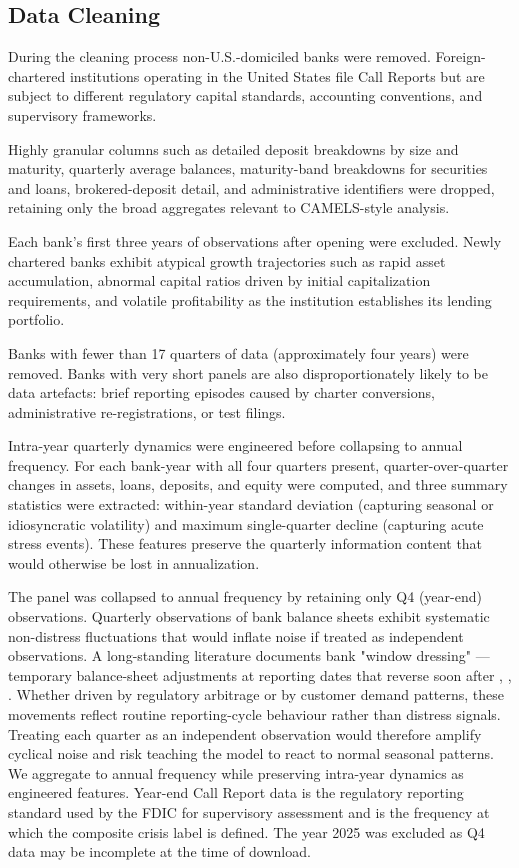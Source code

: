 \documentclass[conference]{IEEEtran}
\begin{document}
\subsection{Data Cleaning}
During the cleaning process non-U.S.-domiciled banks were removed. Foreign-chartered institutions operating in the United States file Call Reports but are subject to different regulatory capital standards, accounting conventions, and supervisory frameworks. 

Highly granular columns such as detailed deposit breakdowns by size and maturity, quarterly average balances, maturity-band breakdowns for securities and loans, brokered-deposit detail, and administrative identifiers were dropped, retaining only the broad aggregates relevant to CAMELS-style analysis.

Each bank's first three years of observations after opening were excluded. Newly chartered banks exhibit atypical growth trajectories such as rapid asset accumulation, abnormal capital ratios driven by initial capitalization requirements, and volatile profitability as the institution establishes its lending portfolio. 

Banks with fewer than 17 quarters of data (approximately four years) were removed. Banks with very short panels are also disproportionately likely to be data artefacts: brief reporting episodes caused by charter conversions, administrative re-registrations, or test filings.

Intra-year quarterly dynamics were engineered before collapsing to annual frequency. For each bank-year with all four quarters present, quarter-over-quarter changes in assets, loans, deposits, and equity were computed, and three summary statistics were extracted: within-year standard deviation (capturing seasonal or idiosyncratic volatility) and maximum single-quarter decline (capturing acute stress events). These features preserve the quarterly information content that would otherwise be lost in annualization.

The panel was collapsed to annual frequency by retaining only Q4 (year-end) observations. Quarterly observations of bank balance sheets exhibit systematic non-distress fluctuations that would inflate noise if treated as independent observations. A long-standing literature documents bank "window dressing" — temporary balance-sheet adjustments at reporting dates that reverse soon after \cite{b15}, \cite{b16}, \cite{b17}. Whether driven by regulatory arbitrage or by customer demand patterns, these movements reflect routine reporting-cycle behaviour rather than distress signals. Treating each quarter as an independent observation would therefore amplify cyclical noise and risk teaching the model to react to normal seasonal patterns. We aggregate to annual frequency while preserving intra-year dynamics as engineered features. Year-end Call Report data is the regulatory reporting standard used by the FDIC for supervisory assessment and is the frequency at which the composite crisis label is defined. The year 2025 was excluded as Q4 data may be incomplete at the time of download.
\end{document}
